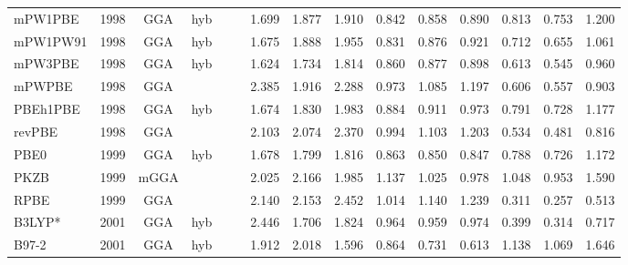 \begin{landscape}
\begin{longtable}{lc:cccc:rrr:rrr:rrr}
    mPW1PBE          & 1998 & GGA  & hyb      &             &           & 1.699             & 1.877             & 1.910  & 0.842              & 0.858             & 0.890  & 0.813   & 0.753 & 1.200 \\
    mPW1PW91         & 1998 & GGA  & hyb      &             &           & 1.675             & 1.888             & 1.955  & 0.831              & 0.876             & 0.921  & 0.712   & 0.655 & 1.061 \\
    mPW3PBE          & 1998 & GGA  & hyb      &             &           & 1.624             & 1.734             & 1.814  & 0.860              & 0.877             & 0.898  & 0.613   & 0.545 & 0.960 \\
    mPWPBE           & 1998 & GGA  &          &             &           & 2.385             & 1.916             & 2.288  & 0.973              & 1.085             & 1.197  & 0.606   & 0.557 & 0.903 \\
    PBEh1PBE         & 1998 & GGA  & hyb      &             &           & 1.674             & 1.830             & 1.983  & 0.884              & 0.911             & 0.973  & 0.791   & 0.728 & 1.177 \\
    revPBE           & 1998 & GGA  &          &             &           & 2.103             & 2.074             & 2.370  & 0.994              & 1.103             & 1.203  & 0.534   & 0.481 & 0.816 \\
    PBE0             & 1999 & GGA  & hyb      &             &           & 1.678             & 1.799             & 1.816  & 0.863              & 0.850             & 0.847  & 0.788   & 0.726 & 1.172 \\
    PKZB             & 1999 & mGGA &          &             &           & 2.025             & 2.166             & 1.985  & 1.137              & 1.025             & 0.978  & 1.048   & 0.953 & 1.590 \\
    RPBE             & 1999 & GGA  &          &             &           & 2.140             & 2.153             & 2.452  & 1.014              & 1.140             & 1.239  & 0.311   & 0.257 & 0.513 \\
    B3LYP*           & 2001 & GGA  & hyb      &             &           & 2.446             & 1.706             & 1.824  & 0.964              & 0.959             & 0.974  & 0.399   & 0.314 & 0.717 \\
    B97-2            & 2001 & GGA  & hyb      &             &           & 1.912             & 2.018             & 1.596  & 0.864              & 0.731             & 0.613  & 1.138   & 1.069 & 1.646 \\

\end{longtable}
\end{landscape}
